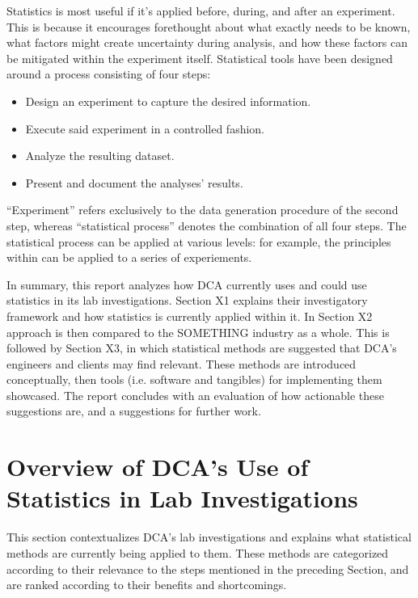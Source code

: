 \documentclass[11pt,a4paper,article]{memoir} %
\begin{document}
\par
Statistics is most useful if it's applied before, during, and after an experiment. This is because it encourages forethought about what exactly needs to be known, what factors might create uncertainty during analysis, and how these factors can be mitigated within the experiment itself. Statistical tools have been designed around a process consisting of four steps:
\begin{itemize}
\item Design an experiment to capture the desired information.
\item Execute said experiment in a controlled fashion.
\item Analyze the resulting dataset.
\item Present and document the analyses' results.
\end{itemize}
``Experiment'' refers exclusively to the data generation procedure of the second step, whereas ``statistical process'' denotes the combination of all four steps.
The statistical process can be applied at various levels: for example, the principles within can be applied to a series of experiements.
\par
In summary, this report analyzes how DCA currently uses and could use statistics in its lab investigations. Section X1 explains their investigatory framework and how statistics is currently applied within it. In Section X2 approach is then compared to the SOMETHING industry as a whole. This is followed by Section X3, in which statistical methods are suggested that DCA's engineers and clients may find relevant. These methods are introduced conceptually, then tools (i.e. software and tangibles) for implementing them showcased. The report concludes with an evaluation of how actionable these suggestions are, and a suggestions for further work.

\newpage



\chapter {Overview of DCA's Use of Statistics in Lab Investigations}
This section contextualizes DCA's lab investigations and explains what statistical methods are currently being applied to them. These methods are categorized according to their relevance to the steps mentioned in the preceding Section, and are ranked according to their benefits and shortcomings. 
\end{document}
